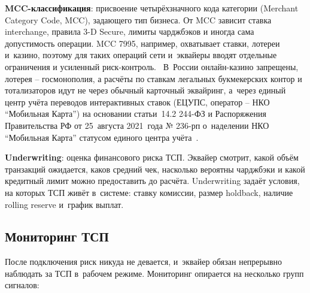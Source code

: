 \textbf{MCC-классификация}: присвоение четырёхзначного кода
категории (Merchant Category Code, MCC), задающего тип бизнеса.
От MCC зависит ставка interchange, правила 3-D Secure, лимиты
чарджбэков и иногда сама допустимость операции. MCC 7995, например, охватывает ставки, лотереи и~казино,
поэтому для таких операций сети и~эквайеры вводят отдельные
ограничения и усиленный
риск-контроль.~\cite{visa-merchant-data-standards-manual,visa-payment-facilitator-marketplace-risk-guide}
В~России онлайн-казино запрещены, лотерея -- госмонополия, а
расчёты по ставкам легальных букмекерских контор и тотализаторов
идут не через обычный карточный эквайринг, а~через единый центр
учёта переводов интерактивных ставок (ЕЦУПС, оператор -- НКО
\enquote{Мобильная Карта}) на основании статьи~14.2 244-ФЗ и
Распоряжения Правительства РФ от 25~августа 2021~года № 236-рп
о~наделении НКО \enquote{Мобильная Карта} статусом единого центра
учёта~\cite{fz-244,etsups}.


\textbf{Underwriting}: оценка финансового риска ТСП. Эквайер
смотрит, какой объём транзакций ожидается, каков средний чек,
насколько вероятны чарджбэки и какой кредитный лимит можно
предоставить до расчёта. Underwriting задаёт условия, на которых
ТСП живёт в~системе: ставку комиссии, размер holdback, наличие
rolling reserve и~график
выплат.~\cite{visa-payment-facilitator-marketplace-risk-guide}
\subsection*{Мониторинг ТСП}

После подключения риск никуда не девается, и~эквайер обязан
непрерывно наблюдать за ТСП в~рабочем режиме. Мониторинг опирается
на несколько групп сигналов:

